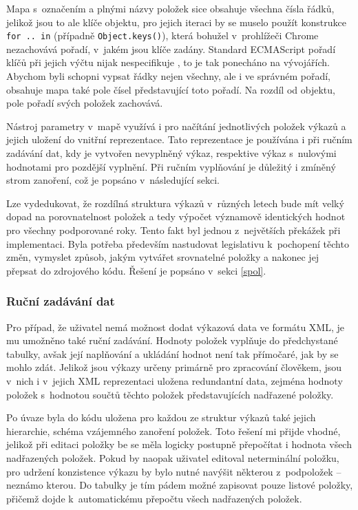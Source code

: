 Mapa s~označením a plnými názvy položek sice obsahuje všechna čísla řádků, jelikož jsou to ale klíče objektu, pro jejich iteraci by se muselo použít konstrukce \texttt{for .. in} (případně \texttt{Object.keys()}), která bohužel v~prohlížeči Chrome nezachovává pořadí, v~jakém jsou klíče zadány. Standard ECMAScript pořadí klíčů při jejich výčtu nijak nespecifikuje \cite{proporder}, to je tak ponecháno na vývojářích. Abychom byli schopni vypsat řádky nejen všechny, ale i ve správném pořadí, obsahuje mapa také pole čísel představující toto pořadí. Na rozdíl od objektu, pole pořadí svých položek zachovává.

Nástroj parametry v~mapě využívá i pro načítání jednotlivých položek výkazů a jejich uložení do vnitřní reprezentace. Tato reprezentace je používána i při ručním zadávání dat, kdy je vytvořen nevyplněný výkaz, respektive výkaz s~nulovými hodnotami pro pozdější vyplnění. Při ručním vyplňování je důležitý i zmíněný strom zanoření, což je popsáno v~následující sekci.

Lze vydedukovat, že rozdílná struktura výkazů v~různých letech bude mít velký dopad na porovnatelnost položek a tedy výpočet významově identických hodnot pro všechny podporované roky. Tento fakt byl jednou z~největších překážek při implementaci. Byla potřeba především nastudovat legislativu k~pochopení těchto změn, vymyslet způsob, jakým vytvářet srovnatelné položky a nakonec jej přepsat do zdrojového kódu. Řešení je popsáno v~sekci \ref{spol}.


\subsubsection{Ruční zadávání dat}
Pro případ, že uživatel nemá možnost dodat výkazová data ve formátu XML, je mu umožněno také ruční zadávání. Hodnoty položek vyplňuje do předchystané tabulky, avšak její naplňování a ukládání hodnot není tak přímočaré, jak by se mohlo zdát. Jelikož jsou výkazy určeny primárně pro zpracování člověkem, jsou v~nich i v~jejich XML reprezentaci uložena redundantní data, zejména hodnoty položek s~hodnotou součtů těchto položek představujících nadřazené položky. 

Po úvaze byla do kódu uložena pro každou ze struktur výkazů také jejich hierarchie, schéma vzájemného zanoření položek. Toto řešení mi přijde vhodné, jelikož při editaci položky be se měla logicky postupně přepočítat i hodnota všech nadřazených položek. Pokud by naopak uživatel editoval neterminální položku, pro udržení konzistence výkazu by bylo nutné navýšit některou z~podpoložek -- neznámo kterou. Do tabulky je tím pádem možné zapisovat pouze listové položky, přičemž dojde k~automatickému přepočtu všech nadřazených položek.

